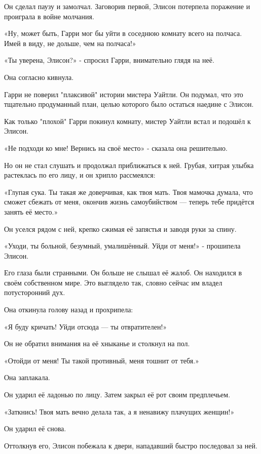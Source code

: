 \documentclass[a4paper,12pt]{book}
\begin{document}
\par
Он сделал паузу и замолчал. Заговорив первой, Элисон потерпела поражение и проиграла в войне молчания.
\par
«Ну, может быть, Гарри мог бы уйти в соседнюю комнату всего на полчаса. Имей в виду, не дольше, чем на полчаса!»
\par
«Ты уверена, Элисон?» - спросил Гарри, внимательно глядя на неё.
\par
Она согласно кивнула.
\par
Гарри не поверил "плаксивой" истории мистера Уайтли. Он подумал, что это тщательно продуманный план, целью которого было остаться наедине с Элисон.\\
\par
Как только "плохой" Гарри покинул комнату, мистер Уайтли встал и подошёл к Элисон.
\par
«Не подходи ко мне! Вернись на своё место» - сказала она решительно.
\par
Но он не стал слушать и продолжал приближаться к ней. Грубая, хитрая улыбка растеклась по его лицу, и он хрипло рассмеялся:
\par
«Глупая сука. Ты такая же доверчивая, как твоя мать. Твоя мамочка думала, что сможет сбежать от меня, окончив жизнь самоубийством — теперь тебе придётся занять её место.»
\par
Он уселся рядом с ней, крепко сжимая её запястья и заводя руки за спину.
\par
«Уходи, ты больной, безумный, умалишённый. Уйди от меня!» - прошипела Элисон.
\par
Его глаза были странными. Он больше не слышал её жалоб. Он находился в своём собственном мире. Это выглядело так, словно сейчас им владел потусторонний дух.
\par
Она откинула голову назад и прохрипела:
\par
«Я буду кричать! Уйди отсюда — ты отвратителен!»
\par
Он не обратил внимания на её хныканье и столкнул на пол.
\par
«Отойди от меня! Ты такой противный, меня тошнит от тебя.»
\par
Она заплакала.
\par
Он ударил её ладонью по лицу. Затем закрыл её рот своим предплечьем.
\par
«Заткнись! Твоя мать вечно делала так, а я ненавижу плачущих женщин!»
\par
Он ударил её снова.
\par
Оттолкнув его, Элисон побежала к двери, нападавший быстро последовал за ней.
\end{document}
